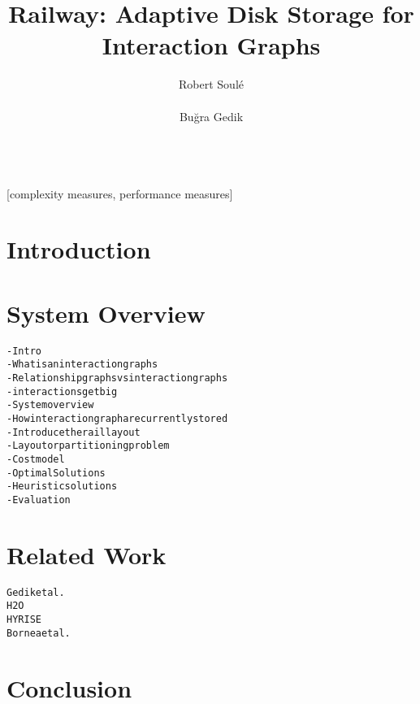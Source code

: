 




%


\title{Railway: Adaptive Disk Storage for Interaction Graphs}


\author{
\alignauthor
Robert Soul\'{e}\\
       \\
\alignauthor
Bu\u{g}ra Gedik\\
       \\
}

\maketitle
\begin{abstract}
              
\end{abstract}

[complexity measures, performance measures]



\section{Introduction}

\section{System Overview}

\begin{alltt}\scriptsize
- Intro
    - What is an interaction graphs
    - Relationship graphs vs interaction graphs 
        - interactions get big
- System overview
    - How interaction graph are currently stored
    - Introduce the rail layout
- Layout or partitioning problem 
    - Cost model
- Optimal Solutions
- Heuristic solutions
- Evaluation
\end{alltt}



\section{Related Work}

\begin{alltt}\scriptsize
Gedik et al.~\cite{gedik14}
H2O \cite{alagiannis14}
HYRISE~\cite{grund10}
Bornea et al.~\cite{bornea13}
\end{alltt}

\section{Conclusion}


  

